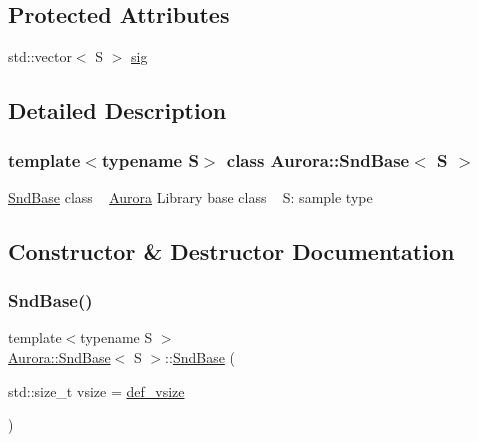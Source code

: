 \subsection*{Protected Attributes}
\begin{DoxyCompactItemize}
\item 
std\+::vector$<$ S $>$ \hyperlink{class_aurora_1_1_snd_base_adad6cd3430a1510dc887cc6bd1a45658}{sig}
\end{DoxyCompactItemize}


\subsection{Detailed Description}
\subsubsection*{template$<$typename S$>$\newline
class Aurora\+::\+Snd\+Base$<$ S $>$}

\hyperlink{class_aurora_1_1_snd_base}{Snd\+Base} class ~\newline
\hyperlink{namespace_aurora}{Aurora} Library base class ~\newline
S\+: sample type 

\subsection{Constructor \& Destructor Documentation}
\mbox{\label{class_aurora_1_1_snd_base_a960739d3ae63df581c28f8801e589a3c}} 
\subsubsection{\texorpdfstring{Snd\+Base()}{SndBase()}}
{\footnotesize\ttfamily template$<$typename S $>$ \\
\hyperlink{class_aurora_1_1_snd_base}{Aurora\+::\+Snd\+Base}$<$ S $>$\+::\hyperlink{class_aurora_1_1_snd_base}{Snd\+Base} (\begin{DoxyParamCaption}\item[{std\+::size\+\_\+t}]{vsize = {\ttfamily \hyperlink{namespace_aurora_afaaddf667a06e7ce23c667a8b7295263}{def\+\_\+vsize}} }\end{DoxyParamCaption})\hspace{0.3cm}{\ttfamily [inline]}}

